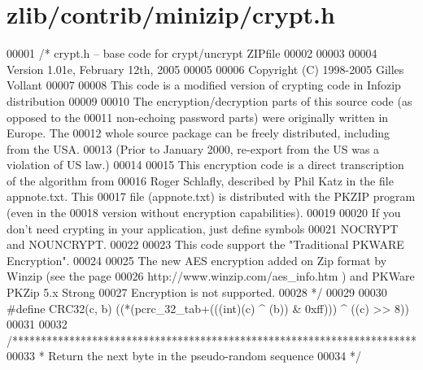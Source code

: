 \hypertarget{zlib_2contrib_2minizip_2crypt_8h_source}{}\section{zlib/contrib/minizip/crypt.h}
\label{zlib_2contrib_2minizip_2crypt_8h_source}

\begin{DoxyCode}
00001 \textcolor{comment}{/* crypt.h -- base code for crypt/uncrypt ZIPfile}
00002 \textcolor{comment}{}
00003 \textcolor{comment}{}
00004 \textcolor{comment}{   Version 1.01e, February 12th, 2005}
00005 \textcolor{comment}{}
00006 \textcolor{comment}{   Copyright (C) 1998-2005 Gilles Vollant}
00007 \textcolor{comment}{}
00008 \textcolor{comment}{   This code is a modified version of crypting code in Infozip distribution}
00009 \textcolor{comment}{}
00010 \textcolor{comment}{   The encryption/decryption parts of this source code (as opposed to the}
00011 \textcolor{comment}{   non-echoing password parts) were originally written in Europe.  The}
00012 \textcolor{comment}{   whole source package can be freely distributed, including from the USA.}
00013 \textcolor{comment}{   (Prior to January 2000, re-export from the US was a violation of US law.)}
00014 \textcolor{comment}{}
00015 \textcolor{comment}{   This encryption code is a direct transcription of the algorithm from}
00016 \textcolor{comment}{   Roger Schlafly, described by Phil Katz in the file appnote.txt.  This}
00017 \textcolor{comment}{   file (appnote.txt) is distributed with the PKZIP program (even in the}
00018 \textcolor{comment}{   version without encryption capabilities).}
00019 \textcolor{comment}{}
00020 \textcolor{comment}{   If you don't need crypting in your application, just define symbols}
00021 \textcolor{comment}{   NOCRYPT and NOUNCRYPT.}
00022 \textcolor{comment}{}
00023 \textcolor{comment}{   This code support the "Traditional PKWARE Encryption".}
00024 \textcolor{comment}{}
00025 \textcolor{comment}{   The new AES encryption added on Zip format by Winzip (see the page}
00026 \textcolor{comment}{   http://www.winzip.com/aes\_info.htm ) and PKWare PKZip 5.x Strong}
00027 \textcolor{comment}{   Encryption is not supported.}
00028 \textcolor{comment}{*/}
00029 
00030 \textcolor{preprocessor}{#define CRC32(c, b) ((*(pcrc\_32\_tab+(((int)(c) ^ (b)) & 0xff))) ^ ((c) >> 8))}
00031 
00032 \textcolor{comment}{/***********************************************************************}
00033 \textcolor{comment}{ * Return the next byte in the pseudo-random sequence}
00034 \textcolor{comment}{ */}

\end{DoxyCode}
